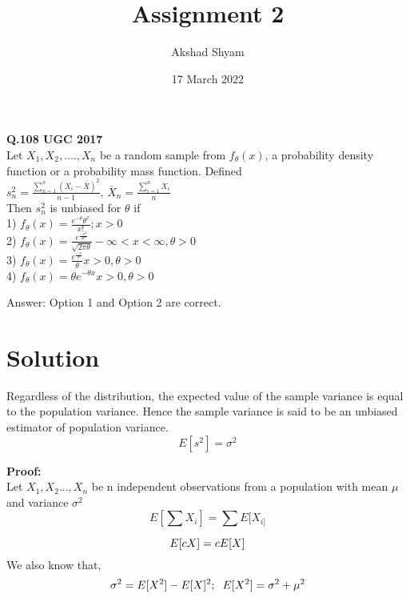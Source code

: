 \documentclass[12pt]{article}
\title{\textbf{Assignment 2}}
\author{Akshad Shyam}
\date{17 March 2022}
\begin{document}
\maketitle

\textbf{Q.108 UGC 2017} \\
Let $X_{1},X_{2},....,X_{n}$ be a random sample from $f_{\theta}(x)$, a probability density function or a probability mass function. Defined \\

$s^{2}_{n} = \frac{\sum_{n=1}^{n}(X_{i} - \overline{X})^{2}} {n-1}$,{\hspace{0.2cm}} $\overline{X}_{n} = \frac{\sum_{i=1}^{n}X_{i}}{n}$ \\

Then $s^{2}_{n}$ is unbiased for ${\theta}$ if \\ 
1) $f_{\theta}(x) = \frac{e^{-\theta}{\theta}^{x}}{x!} ; x>0$ \\
2) $f_{\theta}(x) = \frac{e^{\frac{-x^{2}}{2{\theta}}}}{\sqrt{2\pi\theta}} -\infty<x<\infty,\theta>0$ \\
3) $f_{\theta}(x) = \frac{e^{\frac{-x}{\theta}}}{\theta} x>0,\theta>0$ \\
4) $f_{\theta}(x) = {\theta}e^{-{\theta}x} x>0, \theta>0 $

Answer: Option 1 and Option 2 are correct.

\section{Solution}
Regardless of the distribution, the expected value of the sample variance is equal to the population variance. Hence the sample variance is said to be an unbiased estimator of population variance.
\begin{equation} \label{eq1}
    E[s^{2}] = \sigma^{2}
\end{equation}

\textbf{Proof:} \\
Let $X_{1},X_{2}...,X_{n}$ be n independent observations from a population with mean $\mu$ and variance $\sigma^{2}$ \\
\begin{equation} \label{eq2}
    E[\sum{X_{i}}] = \sum{E[X_{i]}} 
\end{equation}

\begin{equation}\label{eq3}
 E[cX] = cE[X] \\
\end{equation}
We also know that,
\begin{equation}\label{eq4}
    \sigma^{2} = E[X^{2}] - E[X]^{2};{\hspace{0.2cm}} E[X^{2}] = \sigma^{2} + \mu^{2} \\
\end{equation}
\end{document}
